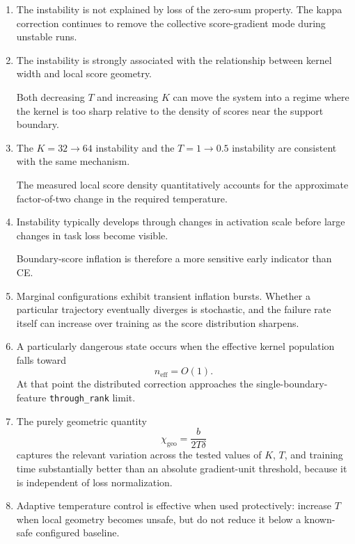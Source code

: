 \documentclass[11pt,a4paper]{article}
\newcommand{\code}[1]{\texttt{#1}}
\newcommand{\neff}{n_{\mathrm{eff}}}
\newcommand{\chigeo}{\chi_{\mathrm{geo}}}
\begin{document}
\begin{enumerate}[leftmargin=1.6em]

\item
The instability is not explained by loss of the zero-sum property.
The kappa correction continues to remove the collective score-gradient mode
during unstable runs.

\item
The instability is strongly associated with the relationship between kernel
width and local score geometry.

Both decreasing \(T\) and increasing \(K\) can move the system into a regime
where the kernel is too sharp relative to the density of scores near the
support boundary.

\item
The \(K=32\to64\) instability and the \(T=1\to0.5\) instability are consistent
with the same mechanism.

The measured local score density quantitatively accounts for the approximate
factor-of-two change in the required temperature.

\item
Instability typically develops through changes in activation scale before
large changes in task loss become visible.

Boundary-score inflation is therefore a more sensitive early indicator than
CE.

\item
Marginal configurations exhibit transient inflation bursts.
Whether a particular trajectory eventually diverges is stochastic, and the
failure rate itself can increase over training as the score distribution
sharpens.

\item
A particularly dangerous state occurs when the effective kernel population
falls toward
\[
\neff=O(1).
\]
At that point the distributed correction approaches the single-boundary-feature
\code{through\_rank} limit.

\item
The purely geometric quantity
\[
\chigeo
=
\frac{b}{2T\delta}
\]
captures the relevant variation across the tested values of \(K\), \(T\), and
training time substantially better than an absolute gradient-unit threshold,
because it is independent of loss normalization.

\item
Adaptive temperature control is effective when used protectively:
increase \(T\) when local geometry becomes unsafe, but do not reduce it below a
known-safe configured baseline.

\end{enumerate}
\end{document}
